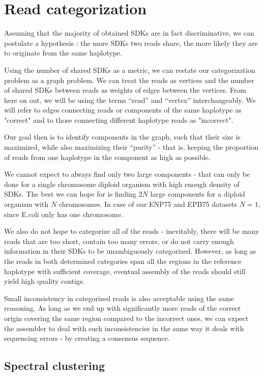 \chapter{Read categorization}

Assuming that the majority of obtained SDKs are in fact discriminative, we can postulate a hypothesis : the more SDKs two reads share, the more likely they are to originate from the same haplotype.

Using the number of shared SDKs as a metric, we can restate our categorization problem as a graph problem. We can treat the reads as vertices and the number of shared SDKs between reads as weights of edges between the vertices. From here on out, we will be using the terms “read” and “vertex” interchangeably. We will refer to edges connecting reads or components of the same haplotype as "correct" and to those connecting different haplotype reads as "incorrect".


Our goal then is to identify components in the graph, such that their size is maximized, while also maximizing their “purity” - that is, keeping the proportion of reads from one haplotype in the component as high as possible.


We cannot expect to always find only two large components - that can only be done for a single chromosome diploid organism with high enough density of SDKs. The best we can hope for is finding $2N$ large components for a diploid organism with $N$ chromosomes. In case of our ENP75 and EPB75 datasets $N = 1$, since E.coli only has one chromosome.


We also do not hope to categorize all of the reads - inevitably, there will be many reads that are too short, contain too many errors, or do not carry enough information in their SDKs to be unambiguously categorized. However, as long as the reads in both determined categories span all the regions in the reference haplotype with sufficient coverage, eventual assembly of the reads should still yield high quality contigs.


Small inconsistency in categorized reads is also acceptable using the same reasoning. As long as we end up with significantly more reads of the correct origin covering the same region compared to the incorrect ones, we can expect the assembler to deal with such inconsistencies in the same way it deals with sequencing errors - by creating a consensus sequence.

\section{Spectral clustering}

